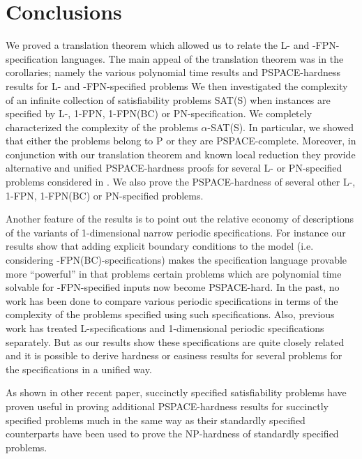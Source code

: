 \section{Conclusions}\label{sec:conclusion}

We proved a translation theorem which allowed us to relate the
{\sf L-} and {-FPN-}specification languages. 
The main appeal of the translation
theorem was in the corollaries; namely the various polynomial time
results and {\sf PSPACE}-hardness results for {\sf L}- and 
{-FPN}-specified problems
We then investigated the complexity of an infinite collection of 
satisfiability problems SAT(S) when instances are specified by 
{\sf L-, 1-FPN, 1-FPN(BC)} or {\sf PN}-specification. 
We completely characterized the
complexity of the problems $\alpha$-{\sf SAT(S)}. In particular, 
we  showed that either the problems belong to
{\sf P} or they are {\sf PSPACE}-complete. 
Moreover, in conjunction with our translation theorem and known local 
reduction they provide alternative and unified {\sf PSPACE}-hardness proofs for
several {\sf L}- or 
{\sf PN}-specified problems considered in \cite{LW92,Or82a}.
We also prove the {\sf PSPACE}-hardness of several other 
{\sf L-, 1-FPN, 1-FPN(BC)} or {\sf PN}-specified problems.  



Another feature of the results is to point out the relative 
economy of descriptions of
the variants of 1-dimensional narrow periodic specifications. For instance our
results show that adding explicit boundary conditions to the model (i.e.
considering {-FPN(BC)}-specifications) makes the specification 
language provable
more ``powerful'' in that problems certain problems which are polynomial time
solvable for {-FPN}-specified inputs now become {\sf PSPACE-hard}. 
In the past,
no work has been done to compare various periodic specifications in terms of
the complexity of the problems specified using such specifications. Also,
previous work has treated {\sf L}-specifications and 1-dimensional periodic 
specifications separately. But as our results show these specifications are
quite closely related and it is possible to derive hardness or easiness results
for several problems for the specifications in a unified way.

\iffalse

As shown in other recent paper, 
succinctly specified satisfiability problems have proven useful in 
proving additional {\sf PSPACE}-hardness results for 
succinctly specified problems much in the same way as their 
standardly specified counterparts have been used to prove the 
{\sf NP}-hardness of  standardly specified problems.


